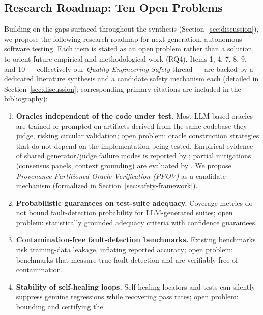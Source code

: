\subsection{Research Roadmap: Ten Open Problems}
\label{sec:research-roadmap}
Building on the gaps surfaced throughout the synthesis
(Section~\ref{sec:discussion}), we propose the following research
roadmap for next-generation, autonomous software testing. Each item is
stated as an open problem rather than a solution, to orient future
empirical and methodological work (RQ4). Items 1, 4, 7, 8, 9, and 10 —
collectively our \emph{Quality Engineering Safety} thread — are backed
by a dedicated literature synthesis and a candidate safety mechanism each
(detailed in Section~\ref{sec:discussion}; corresponding primary citations
are included in the bibliography):

\begin{enumerate}
  \item \textbf{Oracles independent of the code under test.} Most
        LLM-based oracles are trained or prompted on artifacts derived
        from the same codebase they judge, risking circular validation;
        open problem: oracle construction strategies that do not
        depend on the implementation being tested. Empirical evidence
        of shared generator/judge failure modes is reported by
        \cite{panickssery2024evaluators,wataoka2024selfpreference,
        huang2023selfcorrect,olausson2023selfrepair}; partial mitigations
        (consensus panels, context grounding) are evaluated by
        \cite{xu2025candor,bodicoat2026oracle,molina2024oracleautomation}.
        We propose \emph{Provenance-Partitioned Oracle Verification
        (PPOV)} as a candidate mechanism (formalized in
        Section~\ref{sec:safety-framework}).
  \item \textbf{Probabilistic guarantees on test-suite adequacy.}
        Coverage metrics do not bound fault-detection probability for
        LLM-generated suites; open problem: statistically grounded
        adequacy criteria with confidence guarantees.
  \item \textbf{Contamination-free fault-detection benchmarks.}
        Existing benchmarks risk training-data leakage, inflating
        reported accuracy; open problem: benchmarks that measure true
        fault detection and are verifiably free of contamination.
  \item \textbf{Stability of self-healing loops.} Self-healing locators
        and tests can silently suppress genuine regressions while
        recovering pass rates; open problem: bounding and certifying the

\end{enumerate}

